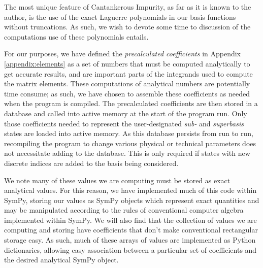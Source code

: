 





% 

The most unique feature of Cantankerous Impurity, as far as it is known to the
author, is the use of the exact Laguerre polynomials in our basis functions without truncations. As such, we wish to devote some time to discussion of the computations use of these polynomials entails.

For our purposes, we have defined the \emph{precalculated coefficients} in
Appendix \ref{appendix:elements} as a set of numbers that must be computed
analytically to get accurate results, and are important parts of the integrands
used to compute the matrix elements. These computations of analytical numbers
are potentially time consume; as such, we have chosen to assemble these
coefficients as needed when the program is compiled. The precalculated
coefficients are then stored in a database and called into active memory at the
start of the program run. Only those coefficients needed to represent the
user-designated \emph{sub-} and \emph{superbasis} states are loaded into active
memory. As this database persists from run to run, recompiling the program to
change various physical or technical parameters does not necessitate adding to
the database. This is only required if states with new discrete indices are
added to the basis being considered.

We note many of these values we are computing must be stored as exact analytical
values. For this reason, we have implemented much of this code within SymPy,
storing our values as SymPy objects which represent exact quantities and may be
manipulated according to the rules of conventional computer algebra implemented
within SymPy. We will also find that the collection of values we are computing
and storing have coefficients that don't make conventional rectangular storage
easy. As such, much of these arrays of values are implemented as Python
dictionaries, allowing easy association between a particular set of coefficients
and the desired analytical SymPy object.

